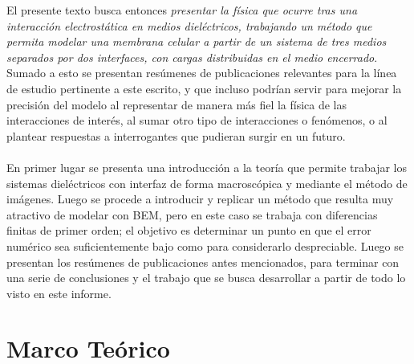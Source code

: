\documentclass[12pt, notitlepage]{article}
\begin{document}
El presente texto busca entonces \textit{presentar la física que ocurre tras una interacción electrostática en medios dieléctricos, trabajando un método que permita modelar una membrana celular a partir de un sistema de tres medios separados por dos interfaces, con cargas distribuidas en el medio encerrado}. Sumado a esto se presentan resúmenes de publicaciones relevantes para la línea de estudio pertinente a este escrito, y que incluso podrían servir para mejorar la precisión del modelo al representar de manera más fiel la física de las interacciones de interés, al sumar otro tipo de interacciones o fenómenos, o al plantear respuestas a interrogantes que pudieran surgir en un futuro.\\\\
En primer lugar se presenta una introducción a la teoría que permite trabajar los sistemas dieléctricos con interfaz de forma macroscópica y mediante el método de imágenes. Luego se procede a introducir y replicar un método que resulta muy atractivo de modelar con BEM, pero en este caso se trabaja con diferencias finitas de primer orden; el objetivo es determinar un punto en que el error numérico sea suficientemente bajo como para considerarlo despreciable. Luego se presentan los resúmenes de publicaciones antes mencionados, para terminar con una serie de conclusiones y el trabajo que se busca desarrollar a partir de todo lo visto en este informe.




\section{Marco Teórico}
\end{document}
